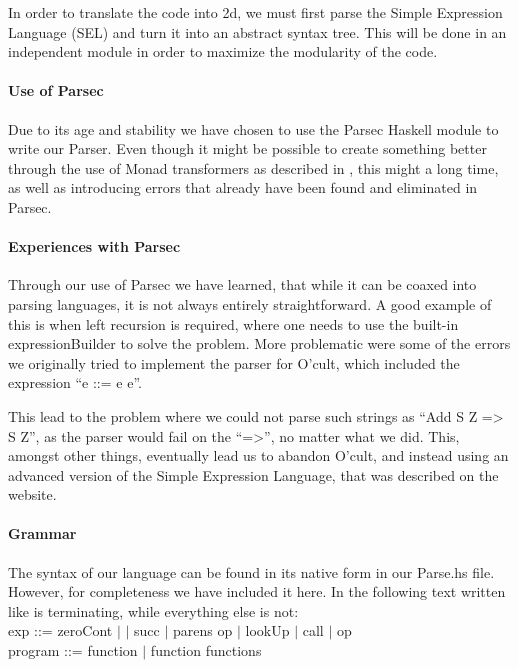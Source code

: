 In order to translate the code into 2d, we must first parse the Simple
Expression Language (SEL) and turn it into an abstract syntax
tree. This will be done in an independent module in order to maximize
the modularity of the code.

\paragraph{Use of Parsec}
Due to its age and stability we have chosen to use the Parsec Haskell
module to write our Parser. Even though it might be possible to create
something better through the use of Monad transformers as described in
\cite{partial+parsing}, this might a long time, as well as introducing
errors that already have been found and eliminated in Parsec.

\paragraph{Experiences with Parsec}
Through our use of Parsec we have learned, that while it can be coaxed
into parsing languages, it is not always entirely straightforward. A
good example of this is when left recursion is required, where one
needs to use the built-in expressionBuilder to solve the problem. More
problematic were some of the errors we originally tried to implement
the parser for O'cult, which included the expression ``e ::= e e''.

This lead to the problem where we could not parse such strings as
``Add S Z => S Z'', as the parser would fail on the ``=>'', no matter
what we did. This, amongst other things, eventually lead us to abandon
O'cult, and instead using an advanced version of the Simple Expression
Language, that was described on the website.

\paragraph{Grammar}
The syntax of our language can be found in its native form in our
Parse.hs file. However, for completeness we have included it here. In
the following text written like  is terminating, while
everything else is not:\\

exp ::= zeroCont $\mid$  $\mid$ succ $\mid$ parens op $\mid$ lookUp $\mid$ call $\mid$ op\\

program ::= function $\mid$ function functions\\

